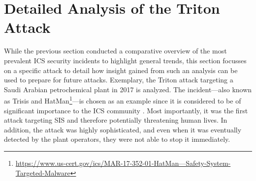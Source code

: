 \documentclass[runningheads]{llncs}
\begin{document}
\section{Detailed Analysis of the Triton Attack}
\label{section:triton}
While the previous section conducted a comparative overview of the most prevalent ICS security incidents to highlight general trends, this section focusses on a specific attack to detail how insight gained from such an analysis can be used to prepare for future attacks.
Exemplary, the Triton attack targeting a Saudi Arabian petrochemical plant in 2017 is analyzed.
The incident---also known as Trisis \cite{dragos.17} and HatMan\footnote{\url{https://www.us-cert.gov/ics/MAR-17-352-01-HatMan—Safety-System-Targeted-Malware}}---is chosen as an example since it is considered to be of significant importance to the ICS community \cite{dragos.17}.
Most importantly, it was the first attack targeting SIS and therefore potentially threatening human lives.
In addition, the attack was highly sophisticated, and even when it was eventually detected by the plant operators, they were not able to stop it immediately.
\end{document}

